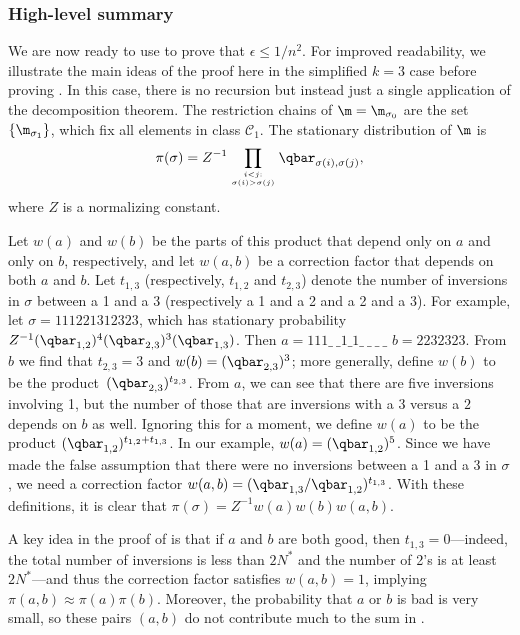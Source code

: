 \documentclass{toc}
\begin{document}
%
\subsubsection{High-level summary}  %
 We are now ready to use  to prove 
that  %
$\epsilon\leq 1/n^2$. %
For improved 
readability, we illustrate the main ideas of the proof here 
in the simplified $k=3$ case before proving . 
In this case, there is no recursion but 
instead just a single application of the decomposition theorem.  The 
restriction chains of $\m=\m_{\sigma_0}$ are the set 
$\{\m_{\sigma_1}\}$, which 
fix all elements in class $\mathcal{C}_1$.  
The stationary distribution of $\m$ is
\begin{equation}\label{eq:statdist}
\pi(\sigma) = Z^{-1} \prod_{i < j:\atop \sigma(i) > \sigma(j)}\qbar_{\sigma(i), \sigma(j)},
\end{equation}
where $Z$ is a normalizing constant.

Let $w(a)$ and $ w(b)$ be the parts of this product that depend only on 
$a$ and only on $b$, respectively, and let $w(a,b)$ be a correction 
factor that depends on both $a$ and $b$.  Let $t_{1,3}$ (respectively, 
$t_{1,2}$ and $t_{2,3}$) denote the number of inversions in $\sigma$ 
between a 1 and a 3 (respectively a 1 and a 2 and a 2 and a 3). For 
example, let $\sigma = 111221312323$, which has stationary probability 
$Z^{-1}(\qbar_{1,2})^4(\qbar_{2,3})^3(\qbar_{1,3})$.  Then $a=111\_\ \_1\_1\_\ \_\ \_\ \_$ 
$b=2232323$.  From $b$ we find that $t_{2,3}=3$ and 
$w(b)=(\qbar_{2,3})^3$; more generally, define $w(b)$ to be the 
product~$(\qbar_{2,3})^{t_{2,3}}$. From $a$, we can see that there are five 
inversions involving 1, but the number of those that are inversions 
with a $3$ versus a $2$ depends on $b$ as well. Ignoring this for a 
moment, we define $w(a)$ to be the product $(\qbar_{1,2})^{t_{1,2}+t_{1,3}}$. 
In our example, $w(a)=(\qbar_{1,2})^5$.  Since we have made the false 
assumption that there were no inversions between a 1 and a 3 in 
$\sigma$, we need a correction factor 
$w(a,b)=(\qbar_{1,3}/\qbar_{1,2})^{t_{1,3}}$.
With these definitions, it is clear that $\pi(\sigma)=Z^{-1}w(a)w(b)w(a,b)$.


A key idea in the proof of  is that if $a$ and $b$ are both good, then 
$t_{1,3}=0$---indeed, the total number of inversions is less than 
$2N^*$ and the number of 2's is at least $2N^*$---and thus the 
correction factor satisfies $w(a,b)=1$, implying $\pi(a,b)\approx \pi(a)\pi(b)$. 
Moreover, the probability that $a$ or $b$ is bad is very small, so 
these pairs $(a,b)$ do not contribute much to the sum in 
.  
\end{document}
